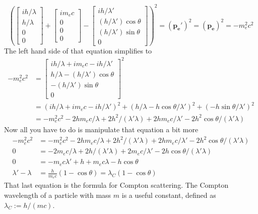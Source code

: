 \documentclass[12pt]{article}
\begin{document}
\[ \left( \begin{bmatrix} i h / \lambda \\ h / \lambda \\ 0 \\ 0 \end{bmatrix}
+ \begin{bmatrix} i m_e c \\ 0 \\ 0 \\ 0 \end{bmatrix}
- \begin{bmatrix} i h / \lambda' \\ (h / \lambda') \cos \theta \\ (h / \lambda') \sin \theta \\ 0 \end{bmatrix} \right)^2
= (\boldsymbol{p_e'})^2 = (\boldsymbol{p_e})^2 = - m_e^2 c^2 \]
The left hand side of that equation simplifies to
\begin{align*}
    - m_e^2 c^2 &= \begin{bmatrix} i h / \lambda + i m_e c - i h / \lambda' \\ h / \lambda - (h / \lambda') \cos \theta \\ - (h / \lambda') \sin \theta \\ 0 \end{bmatrix}^2 \\
                &= (ih/\lambda + im_ec - ih/\lambda')^2 + (h/\lambda - h\cos \theta / \lambda')^2 + (-h \sin \theta / \lambda')^2 \\
                &= - m_e^2c^2 - 2hm_ec/\lambda + 2h^2/(\lambda' \lambda) + 2hm_ec/\lambda' - 2h^2\cos \theta / (\lambda' \lambda)
\end{align*}
Now all you have to do is manipulate that equation a bit more
\begin{align*}
    - m_e^2 c^2 &= - m_e^2c^2 - 2hm_ec/\lambda + 2h^2/(\lambda' \lambda) + 2hm_ec/\lambda' - 2h^2\cos \theta / (\lambda' \lambda) \\
    0 &= - 2m_ec/\lambda + 2h/(\lambda' \lambda) + 2m_ec/\lambda' - 2h\cos \theta / (\lambda' \lambda) \\
    0 &= -m_ec\lambda' + h + m_ec\lambda - h\cos \theta \\
    \lambda' - \lambda &= \frac{h}{m_e c} (1 - \cos \theta) = \lambda_C (1 - \cos \theta)
\end{align*}
That last equation is the formula for Compton scattering. The Compton wavelength of a particle with mass $m$ is a useful constant, defined as $\lambda_C := h/(m c)$.
\end{document}
